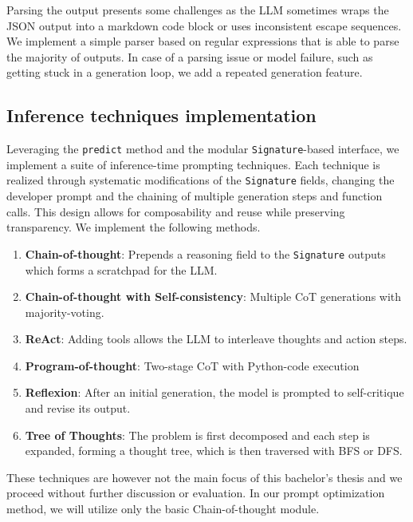 Parsing the output presents some challenges as the LLM sometimes wraps the JSON output into a markdown code block
or uses inconsistent escape sequences. We implement a simple parser based on regular expressions that is able to parse 
the majority of outputs. In case of a parsing issue or model failure, such as getting stuck in a generation loop, we add a repeated generation
feature.

\subsection{Inference techniques implementation}
Leveraging the \texttt{predict} method and the modular \texttt{Signature}-based interface, we implement a suite of inference-time prompting techniques. 
Each technique is realized through systematic modifications of the \texttt{Signature} fields, changing the developer prompt and the chaining of multiple generation steps 
and function calls. This design allows for composability and reuse while preserving transparency.
We implement the following methods.
\begin{enumerate}
    \item \textbf{Chain-of-thought}\cite{NEURIPS2022_8bb0d291}: Prepends a reasoning field to the \texttt{Signature} outputs which forms a scratchpad for the LLM.
    \item \textbf{Chain-of-thought with Self-consistency}\cite{wang2023selfconsistencyimproveschainthought}: Multiple CoT generations with majority-voting.
    \item \textbf{ReAct}\cite{yao2023reactsynergizingreasoningacting}: Adding tools allows the LLM to interleave thoughts and action steps.
    \item \textbf{Program-of-thought}\cite{chen2023programthoughtspromptingdisentangling}: Two-stage CoT with Python-code execution
    \item \textbf{Reflexion}\cite{shinn2023reflexionlanguageagentsverbal}: After an initial generation, the model is prompted to self-critique and revise its output.
    \item \textbf{Tree of Thoughts}\cite{yao2023treethoughtsdeliberateproblem}: The problem is first decomposed and each step is expanded, forming a thought tree, which is then traversed with BFS or DFS.
\end{enumerate}

These techniques are however not the main focus of this bachelor's thesis and we proceed without further discussion or evaluation.
In our prompt optimization method, we will utilize only the basic Chain-of-thought module.

